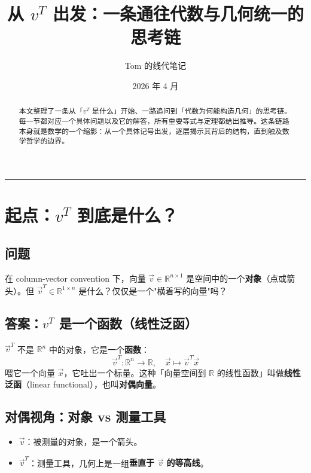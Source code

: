 \documentclass[11pt,a4paper]{article}
\title{\textbf{从 $v^T$ 出发：一条通往代数与几何统一的思考链}}
\author{Tom 的线代笔记}
\date{2026 年 4 月}
\begin{document}
\maketitle

\begin{abstract}
    本文整理了一条从「$v^T$ 是什么」开始、一路追问到「代数为何能构造几何」的思考链。每一节都对应一个具体问题以及它的解答，所有重要等式与定理都给出推导。这条链路本身就是数学的一个缩影：从一个具体记号出发，逐层揭示其背后的结构，直到触及数学哲学的边界。
\end{abstract}

\tableofcontents
\bigskip
\hrule
\bigskip

\section{起点：$v^T$ 到底是什么？}

\subsection{问题}

在 column-vector convention 下，向量 $\vec{v} \in \mathbb{R}^{n \times 1}$ 是空间中的一个\textbf{对象}（点或箭头）。但 $\vec{v}^T \in \mathbb{R}^{1 \times n}$ 是什么？仅仅是一个"横着写的向量"吗？

\subsection{答案：$v^T$ 是一个函数（线性泛函）}

\begin{insight}
    $\vec{v}^T$ 不是 $\mathbb{R}^n$ 中的对象，它是一个\textbf{函数}：
    $$\vec{v}^T : \mathbb{R}^n \to \mathbb{R}, \quad \vec{x} \mapsto \vec{v}^T \vec{x}$$
    喂它一个向量 $\vec{x}$，它吐出一个标量。这种「向量空间到 $\mathbb{R}$ 的线性函数」叫做\textbf{线性泛函}（linear functional），也叫\textbf{对偶向量}。
\end{insight}

\subsection{对偶视角：对象 vs 测量工具}

\begin{itemize}[leftmargin=*]
    \item $\vec{v}$：被测量的对象，是一个箭头。
    \item $\vec{v}^T$：测量工具，几何上是一组\textbf{垂直于 $\vec{v}$ 的等高线}。
\end{itemize}
\end{document}
